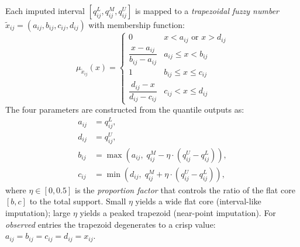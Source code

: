 \documentclass[a4paper,fleqn,longmktitle]{cas-sc}
\begin{document}
	Each imputed interval $[q^L_{ij}, q^M_{ij}, q^U_{ij}]$ is mapped to a
	\emph{trapezoidal fuzzy number}~\citep{zimmermann2001fuzzy}
	$\tilde{x}_{ij} = (a_{ij}, b_{ij}, c_{ij}, d_{ij})$
	with membership function:
	\begin{equation}
		\mu_{\tilde{x}_{ij}}(x) =
		\begin{cases}
			0 & x < a_{ij} \text{ or } x > d_{ij}\\
			\dfrac{x - a_{ij}}{b_{ij} - a_{ij}} & a_{ij} \le x < b_{ij}\\
			1 & b_{ij} \le x \le c_{ij}\\
			\dfrac{d_{ij} - x}{d_{ij} - c_{ij}} & c_{ij} < x \le d_{ij}
		\end{cases}
		\label{eq:trapezoid_membership}
	\end{equation}
	The four parameters are constructed from the quantile outputs as:
	\begin{align}
		a_{ij} &= q^L_{ij}, \label{eq:fuzzy_a} \\
		d_{ij} &= q^U_{ij}, \label{eq:fuzzy_d} \\
		b_{ij} &= \max\!\left(a_{ij},\;
		q^M_{ij} - \eta \cdot (q^U_{ij} - q^L_{ij})\right),
		\label{eq:fuzzy_b} \\
		c_{ij} &= \min\!\left(d_{ij},\;
		q^M_{ij} + \eta \cdot (q^U_{ij} - q^L_{ij})\right),
		\label{eq:fuzzy_c}
	\end{align}
	where $\eta \in [0, 0.5]$ is the \emph{proportion factor} that
	controls the ratio of the flat core $[b,c]$ to the total support.
	Small $\eta$ yields a wide flat core (interval-like imputation);
	large $\eta$ yields a peaked trapezoid (near-point imputation).
	For \emph{observed} entries the trapezoid degenerates to a crisp
	value: $a_{ij} = b_{ij} = c_{ij} = d_{ij} = x_{ij}$.
	
\end{document}
